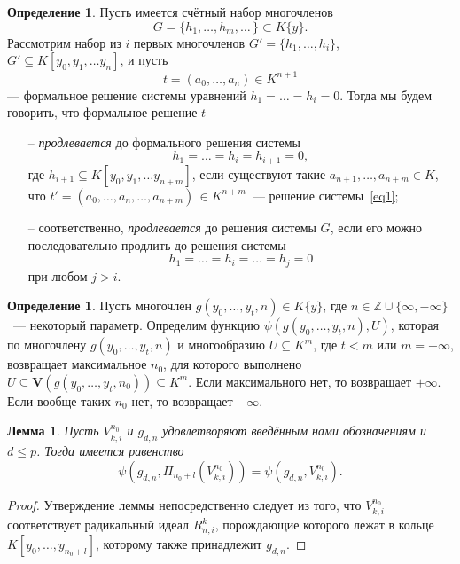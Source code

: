 \documentclass[16pt]{article}
\renewcommand{\le}{\leqslant} %
\theoremstyle{plain1}
\newtheorem{lemma}[theorem1]{Лемма}
\theoremstyle{plain2}
\theoremstyle{plain}
\theoremstyle{plain3}
\theoremstyle{definition}
\newtheorem{definition}[theorem2]{Определение}
\theoremstyle{remark}
\begin{document}
\begin{definition}
Пусть имеется счётный набор многочленов
$$
G=\{h_1,\ldots,h_m,\ldots\,\}\subset K\{y\}.
$$
Рассмотрим набор из $i$ первых многочленов $G'=\{h_1,\ldots,h_i\}$, $G'\subseteq K[y_0,y_1,\ldots
y_n]$, и пусть
$$
t=(a_0,\ldots,a_n)\in K^{n+1}
$$
--- формальное решение системы уравнений $h_1=\ldots=h_i=0$. Тогда мы будем говорить, что формальное решение
$t$ 
\begin{itemize}
\item[--] \emph{продлевается} до формального решения системы
\begin{equation}\label{eq1}
h_1=\ldots=h_i=h_{i+1}=0,
\end{equation}
где $h_{i+1}\subseteq K[y_0,y_1,\ldots y_{n+m}]$,
если существуют такие $a_{n+1},\ldots, a_{n+m}\in K$, что
$t'=(a_0,\ldots,a_n,\ldots,a_{n+m})\,\in K^{n+m}$~--- решение
системы~\eqref{eq1};
\item[--] соответственно, \emph{продлевается} до решения системы $G$, если
его можно последовательно продлить до решения системы 
$$
h_1=\ldots=h_i=\ldots=h_{j}=0$$
при любом $j > i$.
\end{itemize}
\end{definition}



\begin{definition}
Пусть многочлен $g(y_0,\ldots,y_t,n)\in K\{y\}$, где $n\in \mathbb{Z}\cup\{\infty,-\infty\}$~--- некоторый параметр.
Определим функцию $\psi(g(y_0,\ldots,y_t,n),{U})$, которая по многочлену $g(y_0,\ldots,y_t,n)$ и  многообразию ${U}\subseteq K^m$, где $t< m$ или $m=+\infty$, возвращает максимальное $n_0$, для которого выполнено ${U}\subseteq \mathbf{V}(g(y_0,\ldots,y_t,n_0))\subseteq K^m$. Если максимального нет, то возвращает $+\infty$. Если вообще таких  $n_0$ нет, то возвращает $-\infty$.
\end{definition}

\begin{lemma}\label{lemma:o_ravenste_psi}
Пусть ${V}_{k,i}^{n_0}$ и $g_{d,n}$ удовлетворяют введённым нами обозначениям и  $d\le p$. Тогда имеется равенство $$\psi(g_{d,n},\Pi_{n_0+l}({V}_{k,i}^{n_0}))=\psi(g_{d,n},{V}_{k,i}^{n_0}).$$
\end{lemma}

\begin{proof}
Утверждение леммы непосредственно следует из того, что ${V}_{k,i}^{n_0}$ соответствует радикальный идеал $R_{n,i}^k$, порождающие которого лежат в кольце $K[y_0,\ldots,y_{n_0+l}]$, которому также принадлежит $g_{d,n}$.
\end{proof}
\end{document}

